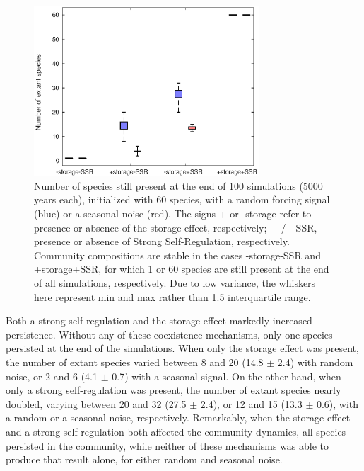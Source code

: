 \documentclass[a4paper,12pt]{article}
\begin{document}
\begin{figure}[!ht]
\begin{centering}
\includegraphics[width=0.75\textwidth]{Fig2}
\par\end{centering}
\caption{Number of species still present at the end of 100 simulations (5000
years each), initialized with 60 species, with a random forcing signal
(blue) or a seasonal noise (red). The signs + or -storage refer to
presence or absence of the storage effect, respectively; + / - SSR,
presence or absence of Strong Self-Regulation, respectively. Community
compositions are stable in the cases -storage-SSR and +storage+SSR,
for which 1 or 60 species are still present at the end of all simulations,
respectively. Due to low variance, the whiskers here represent min
and max rather than 1.5 interquartile range. \label{fig:Persistence-of-species} }
\end{figure}


Both a strong self-regulation and the storage effect markedly increased
persistence. Without any of these coexistence mechanisms, only one
species persisted at the end of the simulations. When only the storage
effect was present, the number of extant species varied between 8
and 20 (14.8 $\pm$ 2.4) with random noise, or 2 and 6 (4.1 $\pm$
0.7) with a seasonal signal. On the other hand, when only a strong
self-regulation was present, the number of extant species nearly doubled,
varying between 20 and 32 (27.5 $\pm$ 2.4), or 12 and 15 (13.3 $\pm$
0.6), with a random or a seasonal noise, respectively. Remarkably,
when the storage effect and a strong self-regulation both affected
the community dynamics, all species persisted in the community, while
neither of these mechanisms was able to produce that result alone,
for either random and seasonal noise.
\end{document}
